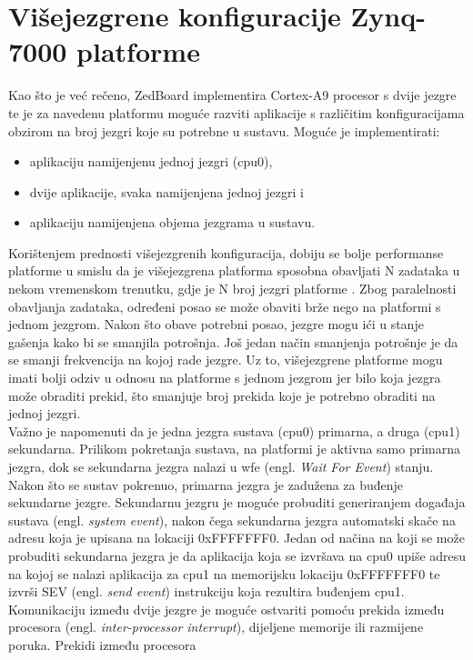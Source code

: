 \documentclass[times, utf8, diplomski, numeric]{fer}
\begin{document}
\chapter{Višejezgrene konfiguracije Zynq-7000 platforme}
Kao što je već rečeno, ZedBoard implementira Cortex-A9 procesor s dvije jezgre te je za navedenu
platformu moguće razviti aplikacije s različitim konfiguracijama obzirom na broj jezgri koje su potrebne
u sustavu. Moguće je implementirati:
\begin{itemize}
  \item{aplikaciju namijenjenu jednoj jezgri (\gls{cpu}0),}
  \item{dvije aplikacije, svaka namijenjena jednoj jezgri i}
  \item{aplikaciju namijenjena objema jezgrama u sustavu.}
\end{itemize}
Korištenjem prednosti višejezgrenih konfiguracija, dobiju se bolje performanse platforme u smislu da je višejezgrena platforma
sposobna obavljati N zadataka u nekom vremenskom trenutku, gdje je N broj jezgri platforme \cite{cortexa_pg}. Zbog paralelnosti
obavljanja zadataka, određeni posao se može obaviti brže nego na platformi s jednom jezgrom. Nakon što obave potrebni posao,
jezgre mogu ići u stanje gašenja kako bi se smanjila potrošnja. Još jedan način smanjenja potrošnje je da se smanji frekvencija
na kojoj rade jezgre. Uz to, višejezgrene platforme mogu imati bolji odziv u odnosu na platforme s jednom jezgrom jer bilo koja
jezgra može obraditi prekid, što smanjuje broj prekida koje je potrebno obraditi na jednoj jezgri.\\
Važno je napomenuti da je jedna jezgra sustava (\gls{cpu}0) primarna, a druga (\gls{cpu}1) sekundarna. Prilikom
pokretanja sustava, na platformi je aktivna samo primarna jezgra, dok se sekundarna jezgra nalazi u
\gls{wfe} (engl. \textit{Wait For Event}) stanju. Nakon što se sustav pokrenuo, primarna jezgra je zadužena
za buđenje sekundarne jezgre. Sekundarnu jezgru je moguće probuditi generiranjem događaja sustava
(engl. \textit{system event}), nakon čega sekundarna jezgra automatski skače na adresu koja je upisana
na lokaciji 0xFFFFFFF0. Jedan od načina na koji se može probuditi sekundarna jezgra je da aplikacija
koja se izvršava na \gls{cpu}0 upiše adresu na kojoj se nalazi aplikacija za \gls{cpu}1 na memorijsku lokaciju
0xFFFFFFF0 te izvrši SEV (engl. \textit{send event}) instrukciju koja rezultira buđenjem \gls{cpu}1.
Komunikaciju između dvije jezgre je moguće ostvariti pomoću prekida između procesora
(engl. \textit{inter-processor interrupt}), dijeljene memorije ili razmijene poruka. Prekidi između procesora
\end{document}
